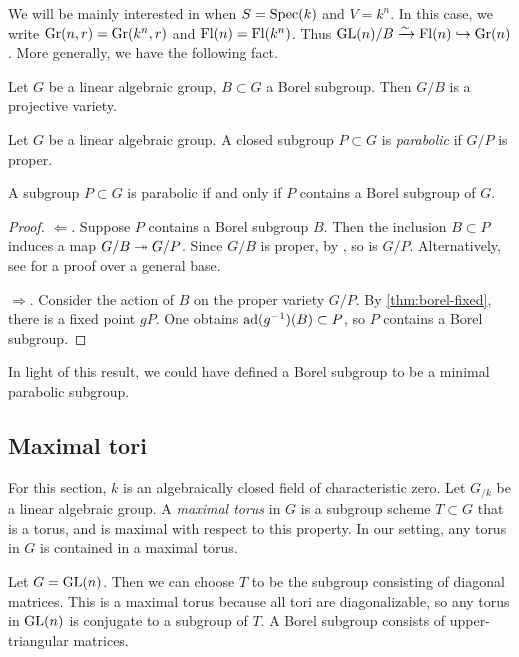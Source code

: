 We will be mainly interested in when $S=\operatorname{Spec}(k)$ and 
$V=k^n$. In this case, we write $\operatorname{Gr}(n,r)=\operatorname{Gr}(k^n,r)$ 
and $\operatorname{Fl}(n)=\operatorname{Fl}(k^n)$. Thus $\operatorname{GL}(n)/B\xrightarrow\sim \operatorname{Fl}(n)\hookrightarrow \operatorname{Gr}(n)$. 
More generally, we have the following fact. 

\begin{theorem}
Let $G$ be a linear algebraic group, $B\subset G$ a Borel subgroup. Then 
$G/B$ is a projective variety. 
\end{theorem}

\begin{definition}
Let $G$ be a linear algebraic group. A closed subgroup $P\subset G$ is 
\emph{parabolic} if $G/P$ is proper. 
\end{definition}

\begin{theorem}
A subgroup $P\subset G$ is parabolic if and only if $P$ contains a Borel 
subgroup of $G$. 
\end{theorem}
\begin{proof}
$\Leftarrow$. Suppose $P$ contains a Borel subgroup $B$. Then the inclusion 
$B\subset P$ induces a map $G/B\twoheadrightarrow G/P$. Since $G/B$ is proper, by 
\cite[II 5.4.3]{ega2}, so is $G/P$. Alternatively, see \cite[XVI 2.5]{sga3-ii} 
for a proof over a general base. 

$\Rightarrow$. Consider the action of $B$ on the proper variety $G/P$. 
By \autoref{thm:borel-fixed}, there is a fixed point $g P$. One obtains 
$\operatorname{ad}(g^{-1})(B)\subset P$, so $P$ contains a Borel subgroup. 
\end{proof}

In light of this result, we could have defined a Borel subgroup to be a minimal 
parabolic subgroup. 





\subsection{Maximal tori}

For this section, $k$ is an algebraically closed field of characteristic 
zero. Let $G_{/k}$ be a linear algebraic group. A \emph{maximal torus} in 
$G$ is a subgroup scheme $T\subset G$ that is a torus, and is maximal with 
respect to this property. In our setting, any torus in $G$ is contained in a 
maximal torus. 


\begin{example}
Let $G=\operatorname{GL}(n)$. Then we can choose $T$ to be the subgroup consisting of 
diagonal matrices. This is a maximal torus because all tori are diagonalizable, 
so any torus in $\operatorname{GL}(n)$ is conjugate to a subgroup of $T$. A Borel subgroup 
consists of upper-triangular matrices. 
\end{example}

